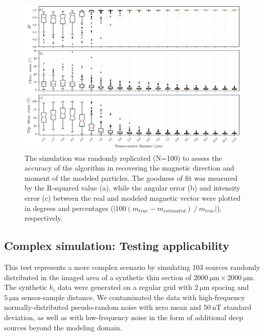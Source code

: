 \begin{figure}[tb!]
  \centering
  \includegraphics[width=1\linewidth]{paper/figures/non-dipolarity-synthetic-inversion.png}
  \caption{The simulation was randomly replicated (N=100) to assess the accuracy of the algorithm in recovering the magnetic direction and moment of the modeled particles. The goodness of fit was measured by the R-squared value (a), while the angular error (b) and intensity error (c) between the real and modeled magnetic vector were plotted in degrees and percentages ($|100 \left( m_{true} - m_{estimated}\right) ~/~ m_{true}|$), respectively.}
  \label{non-dipolarity-synthetic-data-inversion}
\end{figure}



\subsection{Complex simulation: Testing applicability}

This test represents a more complex scenario by simulating 103 sources randomly distributed in the imaged area of a synthetic thin section of $\qty{2000}{\um} \times \qty{2000}{\um}$.
The synthetic $b_z$ data were generated on a regular grid with $\qty{2}{\um}$ spacing and $\qty{5}{\um}$ sensor-sample distance.
We contaminated the data with high-frequency normally-distributed pseudo-random noise with zero mean and $\qty{50}{\nano\tesla}$ standard deviation, as well as with low-frequency noise in the form of additional deep sources beyond the modeling domain.

